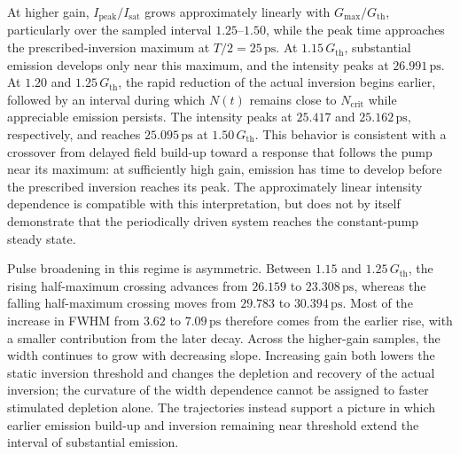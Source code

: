 \documentclass{optica-article}
\begin{document}
At higher gain, $I_{\mathrm{peak}}/I_{\mathrm{sat}}$ grows approximately linearly with $G_{\max}/G_{\mathrm{th}}$, particularly over the sampled interval $1.25$--$1.50$, while the peak time approaches the prescribed-inversion maximum at $T/2=25\,\mathrm{ps}$. At $1.15\,G_{\mathrm{th}}$, substantial emission develops only near this maximum, and the intensity peaks at $26.991\,\mathrm{ps}$. At $1.20$ and $1.25\,G_{\mathrm{th}}$, the rapid reduction of the actual inversion begins earlier, followed by an interval during which $N(t)$ remains close to $N_{\mathrm{crit}}$ while appreciable emission persists. The intensity peaks at $25.417$ and $25.162\,\mathrm{ps}$, respectively, and reaches $25.095\,\mathrm{ps}$ at $1.50\,G_{\mathrm{th}}$. This behavior is consistent with a crossover from delayed field build-up toward a response that follows the pump near its maximum: at sufficiently high gain, emission has time to develop before the prescribed inversion reaches its peak. The approximately linear intensity dependence is compatible with this interpretation, but does not by itself demonstrate that the periodically driven system reaches the constant-pump steady state. 

Pulse broadening in this regime is asymmetric. Between $1.15$ and $1.25\,G_{\mathrm{th}}$, the rising half-maximum crossing advances from $26.159$ to $23.308\,\mathrm{ps}$, whereas the falling half-maximum crossing moves from $29.783$ to $30.394\,\mathrm{ps}$. Most of the increase in FWHM from $3.62$ to $7.09\,\mathrm{ps}$ therefore comes from the earlier rise, with a smaller contribution from the later decay. Across the higher-gain samples, the width continues to grow with decreasing slope. Increasing gain both lowers the static inversion threshold and changes the depletion and recovery of the actual inversion; the curvature of the width dependence cannot be assigned to faster stimulated depletion alone. The trajectories instead support a picture in which earlier emission build-up and inversion remaining near threshold extend the interval of substantial emission.
\end{document}
